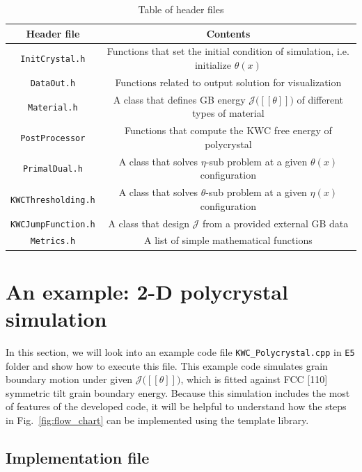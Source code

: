 \documentclass[11pt]{article}
\begin{document}
\begin{table}
\begin{center}
\begin{tabular}{cc} \toprule
Header file     & Contents \\ \midrule
\texttt{InitCrystal.h} & Functions that set the initial condition of simulation, i.e. initialize $\theta(x)$\\
\texttt{DataOut.h} & Functions related to output solution for visualization\\
\texttt{Material.h} & A class that defines GB energy $\mathcal{J}\big( [\![ \theta ]\!] \big)$ of different types of material \\
\texttt{PostProcessor} & Functions that compute the KWC free energy of polycrystal\\
\texttt{PrimalDual.h} & A class that solves $\eta$-sub problem at a given $\theta(x)$ configuration\\
\texttt{KWCThresholding.h} & A class that solves $\theta$-sub problem at a given $\eta(x)$ configuration\\
\texttt{KWCJumpFunction.h} & A class that design $\mathcal{J}$ from a provided external GB data \\
\texttt{Metrics.h} & A list of simple mathematical functions
\end{tabular}
\caption{Table of header files}
\label{tab:symbols}
\end{center}
\end{table}


\section{An example: 2-D polycrystal simulation}

In this section, we will look into an example code file 
\texttt{KWC\_Polycrystal.cpp} in \texttt{E5} folder
and show how to execute this file.
This example code simulates grain boundary motion under 
given $\mathcal{J}\big( [\![ \theta ]\!] \big)$,
which is fitted against FCC [110] symmetric tilt grain boundary energy. 
Because this simulation includes the most of features of
the developed code, it will be helpful to understand 
how the steps in Fig.~\ref{fig:flow_chart} can be implemented 
using the template library. 


\subsection{Implementation file}
\end{document}
